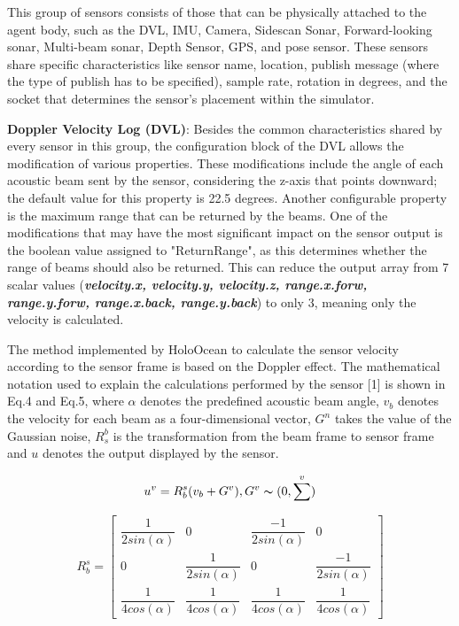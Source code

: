 \documentclass[]{article}
\begin{document}
	This group of sensors consists of those that can be physically attached to the agent body, such as the DVL, IMU, Camera, Sidescan Sonar, Forward-looking sonar, Multi-beam sonar, Depth Sensor, GPS, and pose sensor. These sensors share specific characteristics like sensor name, location, publish message (where the type of publish has to be specified), sample rate, rotation in degrees, and the socket that determines the sensor's placement within the simulator.
	
	\textbf{Doppler Velocity Log (DVL)}: Besides the common characteristics shared by every sensor in this group, the configuration block of the DVL allows the modification of various properties. These modifications include the angle of each acoustic beam sent by the sensor, considering the z-axis that points downward; the default value for this property is 22.5 degrees. Another configurable property is the maximum range that can be returned by the beams. One of the modifications that may have the most significant impact on the sensor output is the boolean value assigned to "ReturnRange", as this determines whether the range of beams should also be returned. This can reduce the output array from 7 scalar values (\textit{\textbf{velocity.x, velocity.y, velocity.z, range.x.forw, range.y.forw, range.x.back, range.y.back}}) to only 3, meaning only the velocity is calculated.
	
	The method implemented by HoloOcean to calculate the sensor velocity according to the sensor frame is based on the Doppler effect. The mathematical notation used to explain the calculations performed by the sensor [1] is shown in Eq.4 and Eq.5, where $\alpha$ denotes the predefined acoustic beam angle, $v_{b}$ denotes the velocity for each beam as a four-dimensional vector, $G^{n}$ takes the value of the Gaussian noise, $R^{b}_{s}$ is the transformation from the beam frame to sensor frame and $u$ denotes the output displayed by the sensor.
	
	\begin{equation}
			u^{v} = R^{s}_{b} (v_{b} + G^{v}), G^{v} \thicksim (0 ,\sum^{v})
	\end{equation}
	
	\begin{equation}
			R^{s}_{b} = \begin{bmatrix}
				\dfrac{1}{2sin(\alpha)} & 0 & \dfrac{-1}{2sin(\alpha)} & 0\\
				0 & \dfrac{1}{2sin(\alpha)} & 0 & \dfrac{-1}{2sin(\alpha)} \\
				\dfrac{1}{4cos(\alpha)} & \dfrac{1}{4cos(\alpha)} & \dfrac{1}{4cos(\alpha)} & \dfrac{1}{4cos(\alpha)}
			\end{bmatrix}
	\end{equation}
	
\end{document}

